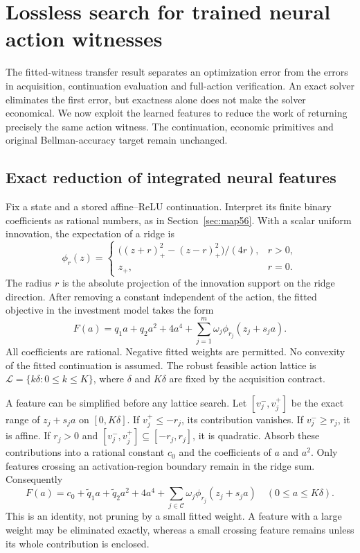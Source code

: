 \section{Lossless search for trained neural action witnesses}\label{sec:lossless59}
The fitted-witness transfer result separates an optimization error from the errors in acquisition, continuation evaluation and full-action verification. An exact solver eliminates the first error, but exactness alone does not make the solver economical. We now exploit the learned features to reduce the work of returning precisely the same action witness. The continuation, economic primitives and original Bellman-accuracy target remain unchanged.

\subsection{Exact reduction of integrated neural features}
Fix a state and a stored affine--ReLU continuation. Interpret its finite binary coefficients as rational numbers, as in Section~\ref{sec:map56}. With a scalar uniform innovation, the expectation of a ridge is
\[
 \phi_r(z)=\begin{cases}
 \bigl((z+r)_+^2-(z-r)_+^2\bigr)/(4r),&r>0,\\
 z_+,&r=0.
 \end{cases}
\]
The radius $r$ is the absolute projection of the innovation support on the ridge direction. After removing a constant independent of the action, the fitted objective in the investment model takes the form
\begin{equation}\label{eq:ridge-objective59}
 F(a)=q_1a+q_2a^2+4a^4+
       \sum_{j=1}^{m}\omega_j\phi_{r_j}(z_j+s_ja).
\end{equation}
All coefficients are rational. Negative fitted weights are permitted. No convexity of the fitted continuation is assumed. The robust feasible action lattice is $\mathcal L=\{k\delta:0\leq k\leq K\}$, where $\delta$ and $K\delta$ are fixed by the acquisition contract.

A feature can be simplified before any lattice search. Let $[v_j^-,v_j^+]$ be the exact range of $z_j+s_ja$ on $[0,K\delta]$. If $v_j^+\leq-r_j$, its contribution vanishes. If $v_j^-\geq r_j$, it is affine. If $r_j>0$ and $[v_j^-,v_j^+]\subseteq[-r_j,r_j]$, it is quadratic. Absorb these contributions into a rational constant $c_0$ and the coefficients of $a$ and $a^2$. Only features crossing an activation-region boundary remain in the ridge sum. Consequently
\begin{equation}\label{eq:exact-reduction59}
 F(a)=c_0+\widetilde q_1a+\widetilde q_2a^2+4a^4+
        \sum_{j\in\mathcal C}\omega_j\phi_{r_j}(z_j+s_ja)
 \quad(0\leq a\leq K\delta).
\end{equation}
This is an identity, not pruning by a small fitted weight. A feature with a large weight may be eliminated exactly, whereas a small crossing feature remains unless its whole contribution is enclosed.


